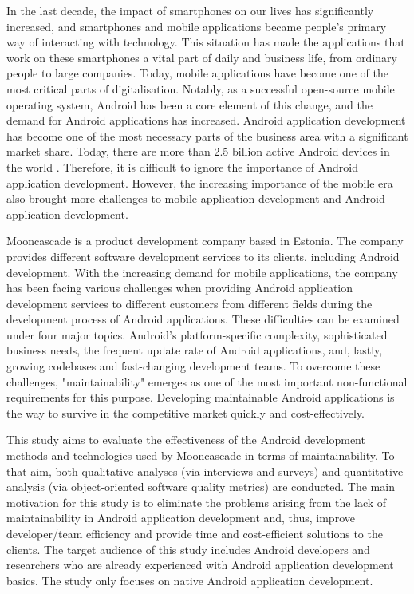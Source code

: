 In the last decade, the impact of smartphones on our lives has significantly increased, and smartphones and mobile applications became people's primary way of interacting with technology. This situation has made the applications that work on these smartphones a vital part of daily and business life, from ordinary people to large companies. Today, mobile applications have become one of the most critical parts of digitalisation. Notably, as a successful open-source mobile operating system, Android has been a core element of this change, and the demand for Android applications has increased. Android application development has become one of the most necessary parts of the business area with a significant market share. Today, there are more than 2.5 billion active Android devices in the world \cite{1}. Therefore, it is difficult to ignore the importance of Android application development.
However, the increasing importance of the mobile era also brought more challenges to mobile application development and Android application development.

Mooncascade is a  product development company based in Estonia. The company provides different software development services to its clients, including Android development. With the increasing demand for mobile applications, the company has been facing various challenges when providing Android application development services to different customers from different fields during the development process of Android applications. These difficulties can be examined under four major topics. Android's platform-specific complexity, sophisticated business needs, the frequent update rate of Android applications, and, lastly, growing codebases and fast-changing development teams. To overcome these challenges, "maintainability" emerges as one of the most important non-functional requirements for this purpose. Developing maintainable Android applications is the way to survive in the competitive market quickly and cost-effectively. 

This study aims to evaluate the effectiveness of the Android development methods and technologies used by Mooncascade in terms of maintainability. To that aim, both qualitative analyses (via interviews and surveys) and quantitative analysis (via object-oriented software quality metrics) are conducted. The main motivation for this study is to eliminate the problems arising from the lack of maintainability in Android application development and, thus, improve developer/team efficiency and provide time and cost-efficient solutions to the clients. The target audience of this study includes Android developers and researchers who are already experienced with Android application development basics. The study only focuses on native Android application development.
 
